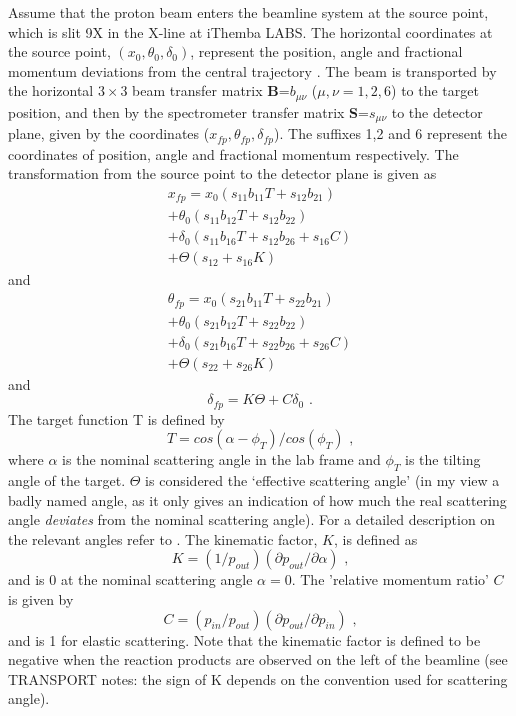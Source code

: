 \documentclass[11pt]{report}
\begin{document}
Assume that the proton beam enters the beamline system at the source point,
which is slit 9X in the X-line at iThemba LABS. 
The horizontal 
coordinates at the source point,
$(x_{0},\theta_{0},\delta_{0})$, represent the position, angle and fractional momentum
deviations from the central trajectory \cite{Wak02}.
The beam is transported by the horizontal
$3 \times 3$ beam transfer matrix {\bf B}=$b_{\mu\nu}$ ($\mu,\nu=1,2,6$) 
to the target position, and then by the spectrometer transfer matrix
{\bf S}=$s_{\mu\nu}$ to the detector plane, given by the coordinates 
($x_{fp},\theta_{fp},\delta_{fp}$). 
The suffixes 1,2 and 6 represent the coordinates of position, angle and
fractional momentum respectively.
The transformation from the source point to the detector plane is given as
%
\begin{eqnarray} 
x_{fp}=x_{0}(s_{11}b_{11}T+s_{12}b_{21})\nonumber\\
+ \theta_{0}(s_{11}b_{12}T+s_{12}b_{22})\nonumber\\
+ \delta_{0}(s_{11}b_{16}T+s_{12}b_{26}+s_{16}C)\nonumber\\
+ \Theta(s_{12}+s_{16}K)  \label{eq:fp-pos}
\end{eqnarray} 
%
and
%
\begin{eqnarray} 
\theta_{fp}=x_{0}(s_{21}b_{11}T+s_{22}b_{21})\nonumber\\
+ \theta_{0}(s_{21}b_{12}T+s_{22}b_{22})\nonumber\\
+ \delta_{0}(s_{21}b_{16}T+s_{22}b_{26}+s_{26}C)\nonumber\\
+ \Theta(s_{22}+s_{26}K) \label{eq:fp-ang}
\end{eqnarray} 
%
and
%
\begin{equation} 
\delta_{fp}=K\Theta + C\delta_{0}  \label{eq:fp-dp} \textrm{      .}
\end{equation} 
The target function T is defined by 
\begin{equation} 
T=cos(\alpha-\phi_T)/cos(\phi_T) \textrm{      ,}
\end{equation} 
where $\alpha$ is the nominal scattering angle in the lab frame and 
$\phi_T$ is the tilting angle of the target. $\Theta$ is considered the 
`effective scattering angle' (in my view a badly named angle, as it only
gives an indication of how much the real scattering angle {\it deviates} from the nominal
scattering angle). For a detailed description on the relevant angles refer to \cite{Fuj02}.
The kinematic factor, $K$, is defined as 
\begin{equation} 
K=(1/p_{out})(\partial p_{out}/\partial \alpha) \textrm{      ,}
\end{equation} 
and is 0 at the nominal scattering angle $\alpha=0$.
The 'relative momentum ratio' $C$ is given by 
\begin{equation} 
C=(p_{in}/p_{out})(\partial p_{out}/\partial p_{in}) \textrm{      ,}
\end{equation} 
and is 1 for elastic scattering.
Note that the kinematic factor is defined to be negative when the reaction products are observed on the left of the beamline
(see TRANSPORT notes: the sign of K depends on the convention used for scattering angle).
\end{document}
